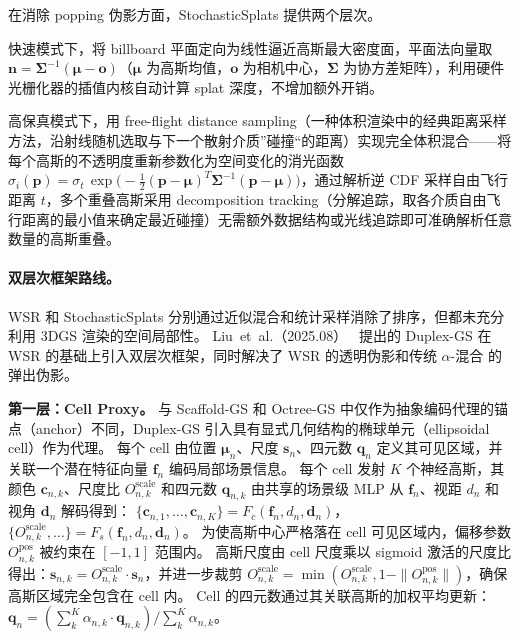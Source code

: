 在消除 popping 伪影方面，StochasticSplats 提供两个层次。

快速模式下，将 billboard 平面定向为线性逼近高斯最大密度面，平面法向量取 $\mathbf{n} = \boldsymbol{\Sigma}^{-1}(\boldsymbol{\mu} - \mathbf{o})$（$\boldsymbol{\mu}$ 为高斯均值，$\mathbf{o}$ 为相机中心，$\boldsymbol{\Sigma}$ 为协方差矩阵），利用硬件光栅化器的插值内核自动计算 splat 深度，不增加额外开销。

高保真模式下，用 free-flight distance sampling（一种体积渲染中的经典距离采样方法，沿射线随机选取与下一个散射介质”碰撞“的距离）实现完全体积混合——将每个高斯的不透明度重新参数化为空间变化的消光函数 $\sigma_i(\mathbf{p}) = \sigma_t\,\exp\!\bigl(-\tfrac{1}{2}(\mathbf{p}-\boldsymbol{\mu})^T\boldsymbol{\Sigma}^{-1}(\mathbf{p}-\boldsymbol{\mu})\bigr)$，通过解析逆 CDF 采样自由飞行距离 $t$，多个重叠高斯采用 decomposition tracking（分解追踪，取各介质自由飞行距离的最小值来确定最近碰撞）无需额外数据结构或光线追踪即可准确解析任意数量的高斯重叠。

\paragraph{双层次框架路线。}
WSR 和 StochasticSplats 分别通过近似混合和统计采样消除了排序，但都未充分利用 3DGS 渲染的空间局部性。
Liu~et~al.（2025.08）~\cite{2508_03180} 提出的 Duplex-GS 在 WSR 的基础上引入双层次框架，同时解决了 WSR 的透明伪影和传统 $\alpha$-混合 的弹出伪影。

\textbf{第一层：Cell Proxy。}
与 Scaffold-GS 和 Octree-GS 中仅作为抽象编码代理的锚点（anchor）不同，Duplex-GS 引入具有显式几何结构的椭球单元（ellipsoidal cell）作为代理。
每个 cell 由位置 $\boldsymbol{\mu}_n$、尺度 $\mathbf{s}_n$、四元数 $\mathbf{q}_n$ 定义其可见区域，并关联一个潜在特征向量 $\mathbf{f}_n$ 编码局部场景信息。
每个 cell 发射 $K$ 个神经高斯，其颜色 $\mathbf{c}_{n,k}$、尺度比 $O_{n,k}^{\mathrm{scale}}$ 和四元数 $\mathbf{q}_{n,k}$ 由共享的场景级 MLP 从 $\mathbf{f}_n$、视距 $d_n$ 和视角 $\mathbf{d}_n$ 解码得到：
$\{\mathbf{c}_{n,1},\ldots,\mathbf{c}_{n,K}\} = F_c(\mathbf{f}_n, d_n, \mathbf{d}_n)$，$\{O_{n,k}^{\mathrm{scale}},\ldots\} = F_s(\mathbf{f}_n, d_n, \mathbf{d}_n)$。
为使高斯中心严格落在 cell 可见区域内，偏移参数 $O_{n,k}^{\mathrm{pos}}$ 被约束在 $[-1,1]$ 范围内。
高斯尺度由 cell 尺度乘以 sigmoid 激活的尺度比得出：$\mathbf{s}_{n,k} = O_{n,k}^{\mathrm{scale}} \cdot \mathbf{s}_n$，并进一步裁剪 $O_{n,k}^{\mathrm{scale}} = \min(O_{n,k}^{\mathrm{scale}}, 1 - \|O_{n,k}^{\mathrm{pos}}\|)$，确保高斯区域完全包含在 cell 内。
Cell 的四元数通过其关联高斯的加权平均更新：$\mathbf{q}_n = (\sum_k^K \alpha_{n,k} \cdot \mathbf{q}_{n,k}) / \sum_k^K \alpha_{n,k}$。

